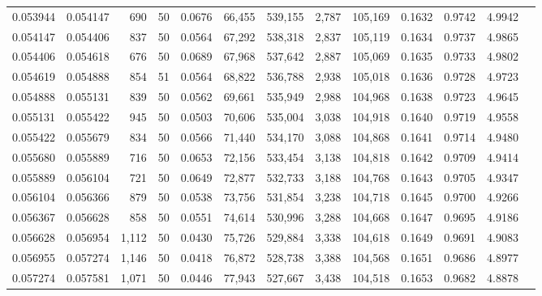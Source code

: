 \begin{tabular}{rrrrrrrrrrrrr}
0.053944 & 0.054147 &   690 &  50 &                                     0.0676 &  66,455 & 539,155 &   2,787 & 105,169 & 0.1632 & 0.9742 & 4.9942 \\
0.054147 & 0.054406 &   837 &  50 &                                     0.0564 &  67,292 & 538,318 &   2,837 & 105,119 & 0.1634 & 0.9737 & 4.9865 \\
0.054406 & 0.054618 &   676 &  50 &                                     0.0689 &  67,968 & 537,642 &   2,887 & 105,069 & 0.1635 & 0.9733 & 4.9802 \\
0.054619 & 0.054888 &   854 &  51 &                                     0.0564 &  68,822 & 536,788 &   2,938 & 105,018 & 0.1636 & 0.9728 & 4.9723 \\
0.054888 & 0.055131 &   839 &  50 &                                     0.0562 &  69,661 & 535,949 &   2,988 & 104,968 & 0.1638 & 0.9723 & 4.9645 \\
0.055131 & 0.055422 &   945 &  50 &                                     0.0503 &  70,606 & 535,004 &   3,038 & 104,918 & 0.1640 & 0.9719 & 4.9558 \\
0.055422 & 0.055679 &   834 &  50 &                                     0.0566 &  71,440 & 534,170 &   3,088 & 104,868 & 0.1641 & 0.9714 & 4.9480 \\
0.055680 & 0.055889 &   716 &  50 &                                     0.0653 &  72,156 & 533,454 &   3,138 & 104,818 & 0.1642 & 0.9709 & 4.9414 \\
0.055889 & 0.056104 &   721 &  50 &                                     0.0649 &  72,877 & 532,733 &   3,188 & 104,768 & 0.1643 & 0.9705 & 4.9347 \\
0.056104 & 0.056366 &   879 &  50 &                                     0.0538 &  73,756 & 531,854 &   3,238 & 104,718 & 0.1645 & 0.9700 & 4.9266 \\
0.056367 & 0.056628 &   858 &  50 &                                     0.0551 &  74,614 & 530,996 &   3,288 & 104,668 & 0.1647 & 0.9695 & 4.9186 \\
0.056628 & 0.056954 & 1,112 &  50 &                                     0.0430 &  75,726 & 529,884 &   3,338 & 104,618 & 0.1649 & 0.9691 & 4.9083 \\
0.056955 & 0.057274 & 1,146 &  50 &                                     0.0418 &  76,872 & 528,738 &   3,388 & 104,568 & 0.1651 & 0.9686 & 4.8977 \\
0.057274 & 0.057581 & 1,071 &  50 &                                     0.0446 &  77,943 & 527,667 &   3,438 & 104,518 & 0.1653 & 0.9682 & 4.8878 \\

\end{tabular}
